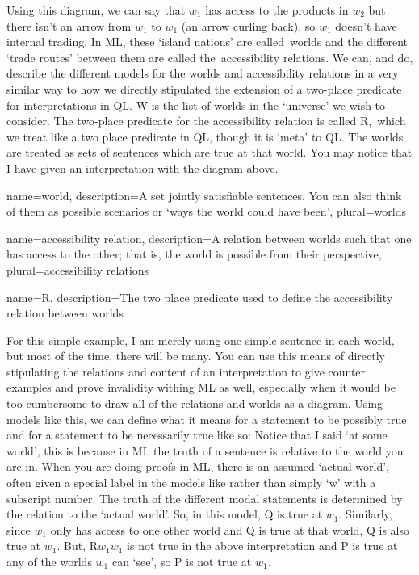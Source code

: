 Using this diagram, we can say that $w_1$ has access to the products in $w_2$ but there isn't an arrow from $w_1$ to $w_1$ (an arrow curling back), so $w_1$ doesn't have internal trading. In ML, these `island nations' are called \glspl{world} and the different `trade routes' between them are called the \glspl{accessibility relation}. We can, and do, describe the different models for the worlds and accessibility relations in a very similar way to how we directly stipulated the extension of a two-place predicate for interpretations in QL. W is the list of worlds in the `universe' we wish to consider. The two-place predicate for the accessibility relation is called \gls{R}, which we treat like a two place predicate in QL, though it is `meta' to QL. The worlds are treated as sets of sentences which are true at that world. You may notice that I have given an interpretation with the diagram above. 

{
name=world,
description={A set jointly satisfiable sentences. You can also think of them as possible scenarios or `ways the world could have been'},
plural=worlds
}

{
name=accessibility relation,
description={A relation between \glspl{world} such that one has access to the other; that is, the world is possible from their perspective},
plural=accessibility relations
}

{
name=R,
description={The two place predicate used to define the \gls{accessibility relation} between \glspl{world}}
}


For this simple example, I am merely using one simple sentence in each world, but most of the time, there will be many. You can use this means of directly stipulating the relations and content of an interpretation to give counter examples and prove invalidity withing ML as well, especially when it would be too cumbersome to draw all of the relations and worlds as a diagram. Using models like this, we can define what it means for a statement to be possibly true and for a statement to be necessarily true like so:
Notice that I said `at some world', this is because in ML the truth of a sentence is relative to the world you are in. When you are doing proofs in ML, there is an assumed `actual world', often given a special label in the models like  rather than simply `w' with a subscript number. The truth of the different modal statements is determined by the relation to the `actual world'. So, in this model, \ediamond Q is true at $w_1$. Similarly, since $w_1$ only has access to one other world and Q is true at that world, \ebox Q is also true at $w_1$. But, R$w_1$$w_1$ is not true in the above interpretation and P is true at any of the worlds $w_1$ can `see', so \ediamond P is not true at $w_1$.

